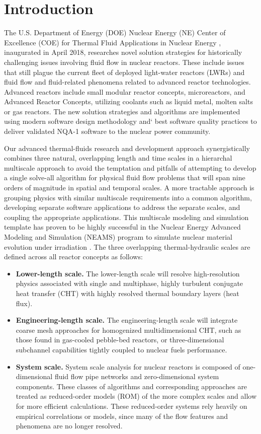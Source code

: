 \section{Introduction}
\label{s:intro}

The U.S. Department of Energy (DOE) Nuclear Energy (NE) Center of Excellence (COE) for Thermal Fluid Applications in Nuclear Energy \cite{shaver2019initial}, inaugurated in April 2018, researches novel solution strategies for historically challenging issues involving fluid flow in nuclear reactors. These include issues that still plague the current fleet of deployed light-water reactors (LWRs) and fluid flow and fluid-related phenomena related to advanced reactor technologies. Advanced reactors include small modular reactor concepts, microreactors, and Advanced Reactor Concepts, utilizing coolants such as liquid metal, molten  salts or gas  reactors. The new solution strategies and algorithms are implemented using modern software design methodology and` best software quality practices to deliver validated NQA-1 software to the nuclear power community.

Our advanced thermal-fluids research and development approach synergistically combines three natural, overlapping length and time scales in a hierarchal multiscale approach to avoid the temptation and
pitfalls of attempting to develop a single solve-all algorithm for physical fluid flow problems that will span nine orders of magnitude in spatial and temporal scales. A more tractable approach is grouping physics with similar multiscale requirements into a common algorithm, developing separate software applications to address the separate scales, and coupling the appropriate applications. This multiscale modeling and simulation template has proven to be highly successful in the Nuclear Energy Advanced Modeling and Simulation (NEAMS) program to simulate nuclear material evolution under irradiation \cite{tonks2013multiscale}. The three overlapping thermal-hydraulic scales are defined across all reactor concepts as follows:
\begin{itemize}
    \item \textbf{Lower-length scale.} The lower-length scale will resolve high-resolution physics
    associated with single and multiphase, highly turbulent conjugate heat transfer (CHT) with highly
    resolved thermal boundary layers (heat flux).
    \item \textbf{Engineering-length scale.} The engineering-length scale will integrate coarse mesh approaches
    for homogenized multidimensional CHT, such as those found in gas-cooled pebble-bed reactors, or three-dimensional subchannel capabilities tightly coupled to nuclear fuels performance.
    \item \textbf{System scale.} System scale analysis for nuclear reactors is composed of one-dimensional fluid flow
    pipe networks and zero-dimensional system components. These classes of algorithms and corresponding approaches are treated as reduced-order models (ROM) of the more complex scales and allow for more efficient calculations. These reduced-order systems rely heavily on empirical correlations or models, since many of the flow features and phenomena are no longer resolved.
\end{itemize}

